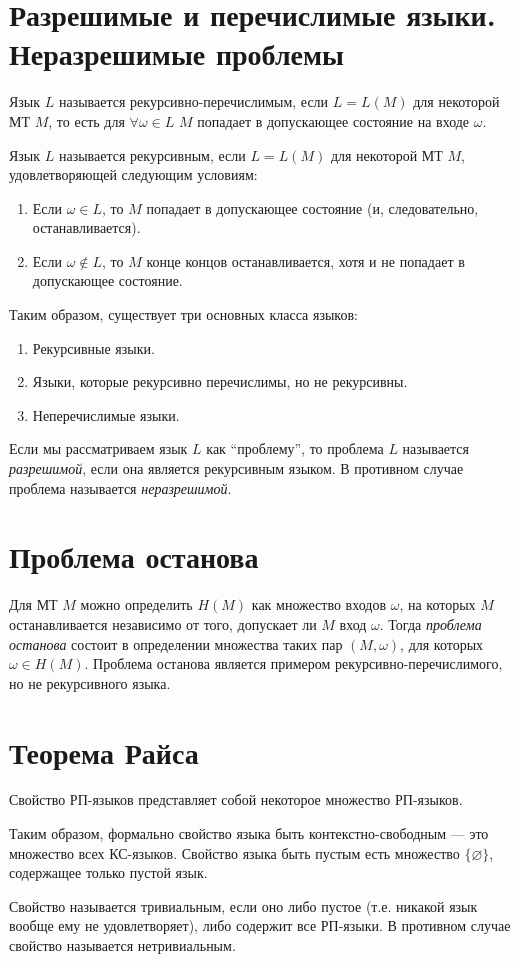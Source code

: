 


\section{Разрешимые и перечислимые языки. Неразрешимые проблемы}
\begin{define}
  Язык $L$ называется рекурсивно-перечислимым, если $L=L(M)$ для
  некоторой МТ $M$, то есть для $\forall\omega\in L$ $M$ попадает в
  допускающее состояние на входе $\omega$.
\end{define}
\begin{define}
  Язык $L$ называется рекурсивным, если $L=L(M)$ для некоторой МТ $M$,
  удовлетворяющей следующим условиям:
  \begin{enumerate}
  \item Если $\omega\in L$, то $M$ попадает в допускающее
    состояние (и, следовательно, останавливается).
  \item Если $\omega\notin L$, то $M$  конце концов
    останавливается, хотя и не попадает в допускающее состояние.
  \end{enumerate}
\end{define}

Таким образом, существует три основных класса языков:
\begin{enumerate}
\item Рекурсивные языки.
\item Языки, которые рекурсивно перечислимы, но не рекурсивны.
\item Неперечислимые языки.
\end{enumerate}


Если мы рассматриваем язык $L$ как ``проблему'', то проблема $L$
называется \emph{разрешимой}, если она является рекурсивным языком. В
противном случае проблема называется \emph{неразрешимой}.
\section{Проблема останова}
Для МТ $M$ можно определить $H(M)$ как множество входов $\omega$, на
которых $M$ останавливается независимо от того, допускает ли $M$ вход
$\omega$.
Тогда \emph{проблема останова} состоит в определении множества таких
пар $(M, \omega)$, для которых $\omega\in H(M)$. Проблема останова
является примером рекурсивно-перечислимого, но не рекурсивного языка.
\section{Теорема Райса}
\begin{define}
  Свойство РП-языков представляет собой некоторое множество РП-языков.
\end{define}
Таким образом, формально свойство языка быть контекстно-свободным ---
это множество всех КС-языков. Свойство языка быть пустым есть
множество $\{\varnothing\}$, содержащее только пустой язык.
\begin{define}
  Свойство называется тривиальным, если оно либо пустое (т.е. никакой
  язык вообще ему не удовлетворяет), либо содержит все РП-языки. В
  противном случае свойство называется нетривиальным.
\end{define}


